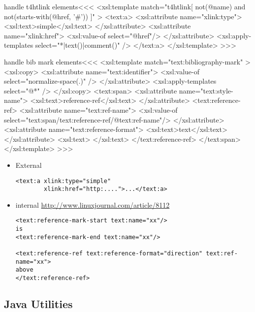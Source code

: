 \documentclass{article}
\begin{document}
\<handle t4htlink elements\><<<
<xsl:template match="t4htlink[ not(@name) 
                           and
                               not(starts-with(@href, '#')) 
]" >
  <text:a>
     <xsl:attribute name="xlink:type">
        <xsl:text>simple</xsl:text>
     </xsl:attribute>
     <xsl:attribute name="xlink:href">
        <xsl:value-of select="@href"/>
     </xsl:attribute>
     <xsl:apply-templates select="*|text()|comment()" />
  </text:a>
</xsl:template> 
>>>





\<handle bib mark elements\><<<
<xsl:template match="text:bibliography-mark" >
   <xsl:copy>
     <xsl:attribute name="text:identifier">
        <xsl:value-of select="normalize-space(.)" />    
     </xsl:attribute>         
     <xsl:apply-templates select="@*" />
   </xsl:copy>
   <text:span>
      <xsl:attribute name="text:style-name">
         <xsl:text>reference-ref</xsl:text>
      </xsl:attribute>
      <text:reference-ref> 
        <xsl:attribute name="text:ref-name">
              <xsl:value-of 
                 select="text:span/text:reference-ref/@text:ref-name"/> 
        </xsl:attribute> 
        <xsl:attribute name="text:reference-format">
              <xsl:text>text</xsl:text> 
        </xsl:attribute>         
        <xsl:text> </xsl:text>
      </text:reference-ref> 
   </text:span>
</xsl:template> 
>>>





\begin{itemize}
\item
External
\begin{verbatim}
<text:a xlink:type="simple" 
        xlink:href="http:....">...</text:a>
\end{verbatim}


\item internal
\url{http://www.linuxjournal.com/article/8112}


\begin{verbatim}
<text:reference-mark-start text:name="xx"/>
is 
<text:reference-mark-end text:name="xx"/>

<text:reference-ref text:reference-format="direction" text:ref-name="xx">
above
</text:reference-ref> 
\end{verbatim}

\end{itemize}


\subsection{Java Utilities}
\end{document}
